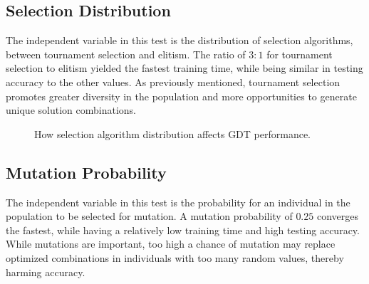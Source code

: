 \documentclass[12pt]{article}
\begin{document}
\subsection{Selection Distribution}

The independent variable in this test is the distribution of selection algorithms, between tournament selection and elitism. The ratio of $3:1$ for tournament selection to elitism yielded the fastest training time, while being similar in testing accuracy to the other values. As previously mentioned, tournament selection promotes greater diversity in the population and more opportunities to generate unique solution combinations.

\begin{figure}[H]
    \centering
    \caption{How selection algorithm distribution affects GDT performance.}
\end{figure}

\subsection{Mutation Probability}

The independent variable in this test is the probability for an individual in the population to be selected for mutation. A mutation probability of $0.25$ converges the fastest, while having a relatively low training time and high testing accuracy. While mutations are important, too high a chance of mutation may replace optimized combinations in individuals with too many random values, thereby harming accuracy.
\end{document}
